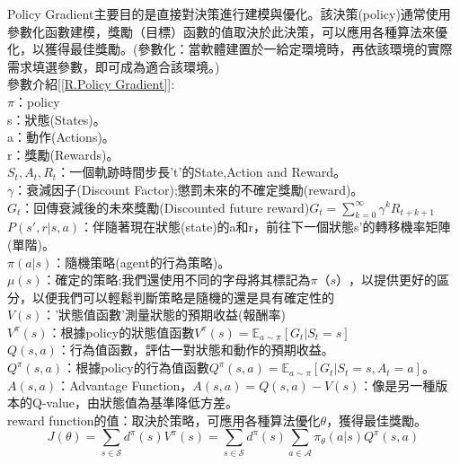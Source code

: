Policy Gradient主要目的是直接對決策進行建模與優化。該決策(policy)通常使用參數化函數建模，獎勵（目標）函數的值取決於此決策，可以應用各種算法來優化，以獲得最佳獎勵。(參數化：當軟體建置於一給定環境時，再依該環境的實際需求填選參數，即可成為適合該環境。)\\
參數介紹[\ref{R.Policy Gradient}]:\\
$\pi$：policy\\
s：狀態(States)。\\
a：動作(Actions)。\\
r：獎勵(Rewards)。\\
$S_t,A_t,R_t$：一個軌跡時間步長't'的State,Action and Reward。 \\
$\gamma$：衰減因子(Discount Factor);懲罰未來的不確定獎勵(reward)。\\
$G_t$：回傳衰減後的未來獎勵(Discounted future reward)$G_t = \sum_{k=0}^{\infty} \gamma^k R_{t+k+1}$\\
$P(s', r \vert s, a)$：伴隨著現在狀態(state)的a和r，前往下一個狀態s'的轉移機率矩陣(單階)。\\
$\pi(a \vert s)$：隨機策略(agent的行為策略)。\\
$\mu(s)$：確定的策略;我們還使用不同的字母將其標記為$ \pi（s）$，以提供更好的區分，以便我們可以輕鬆判斷策略是隨機的還是具有確定性的\\
$V(s)$：'狀態值函數'測量狀態的預期收益(報酬率)\\
$V^\pi(s)$：根據policy的狀態值函數$V^\pi (s) = \mathbb{E}_{a\sim \pi} [G_t \vert S_t = s]$\\
$Q(s, a)$：行為值函數，評估一對狀態和動作的預期收益。\\
$Q^\pi(s, a)$：根據policy的行為值函數$Q^\pi(s, a) = \mathbb{E}_{a\sim \pi} [G_t \vert S_t = s, A_t = a]$。\\
$A(s, a)$：Advantage Function，$A(s, a) = Q(s, a) - V(s)$：像是另一種版本的Q-value，由狀態值為基準降低方差。\\
reward function的值：取決於策略，可應用各種算法優化$\theta$，獲得最佳獎勵。\\[5pt]
$$J(\theta) 
= \sum_{s \in \mathcal{S}} d^\pi(s) V^\pi(s) 
= \sum_{s \in \mathcal{S}} d^\pi(s) \sum_{a \in \mathcal{A}} \pi_\theta(a \vert s) Q^\pi(s, a)$$\\

